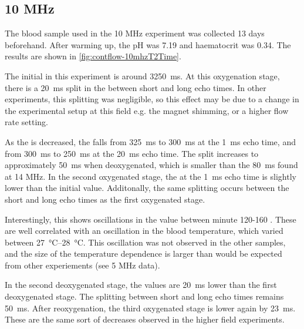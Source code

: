 \subsection{10 MHz}


The blood sample used in the 10 MHz experiment was collected 13 days beforehand.
After warming up, the pH was 7.19 and haematocrit was 0.34.
The results are shown in \autoref{fig:contflow-10mhzT2Time}.

The initial \Ttwo in this experiment is around \SI{3250}{ms}.
At this oxygenation stage, there is a \SI{20}{ms} split in the \Ttwo between short and long echo times.
In other experiments, this splitting was negligible, so this effect may be due to a change in the experimental setup at this field e.g. the magnet shimming, or a higher flow rate setting.

As the \SOtwo is decreased, the \Ttwo falls from \SI{325}{ms} to \SI{300}{ms} at the \SI{1}{ms} echo time, and from \SI{300}{ms} to \SI{250}{ms} at the \SI{20}{ms} echo time.
The split increases to approximately \SI{50}{ms} when deoxygenated, which is smaller than the \SI{80}{ms} found at 14 MHz.
In the second oxygenated stage, the \Ttwo at the \SI{1}{ms} echo time is slightly lower than the initial value.
Additonally, the same splitting occurs between the short and long echo times as the first oxygenated stage.

Interestingly, this shows oscillations in the \Ttwo value between minute 120-160 .
These are well correlated with an oscillation in the blood temperature, which varied between \SIrange{27}{28}{\celsius}.
This oscillation was not observed in the other samples, and the size of the temperature dependence is larger than would be expected from other experiements (see 5 MHz data).

In the second deoxygenated stage, the \Ttwo values are \SI{20}{ms} lower than the first deoxygenated stage.
The splitting between short and long echo times remains \SI{50}{ms}.
After reoxygenation, the third oxygenated stage is lower again by \SI{23}{ms}.
These are the same sort of decreases observed in the higher field experiments.

